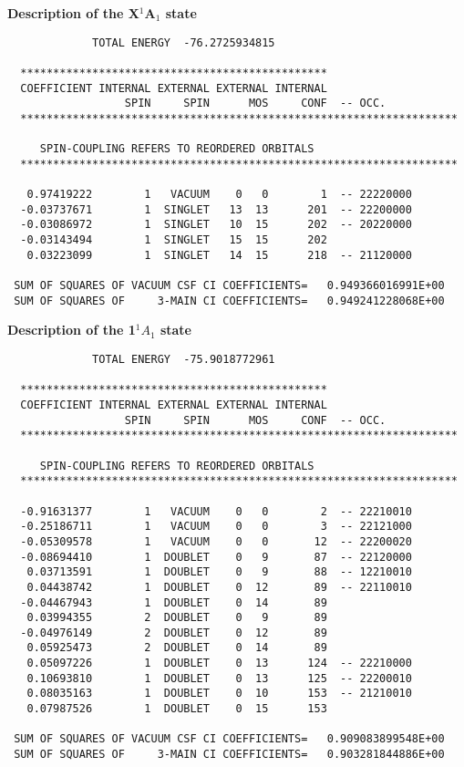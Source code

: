 \documentclass[11pt,fleqn]{article}
\begin{document}
{\bf Description of the X$^{1}$A$_{1}$ state}
{
\footnotesize
\begin{verbatim}
             TOTAL ENERGY  -76.2725934815

  ***********************************************
  COEFFICIENT INTERNAL EXTERNAL EXTERNAL INTERNAL
                  SPIN     SPIN      MOS     CONF  -- OCC.
  *******************************************************************

     SPIN-COUPLING REFERS TO REORDERED ORBITALS
  *******************************************************************

   0.97419222        1   VACUUM    0   0        1  -- 22220000
  -0.03737671        1  SINGLET   13  13      201  -- 22200000
  -0.03086972        1  SINGLET   10  15      202  -- 20220000
  -0.03143494        1  SINGLET   15  15      202
   0.03223099        1  SINGLET   14  15      218  -- 21120000

 SUM OF SQUARES OF VACUUM CSF CI COEFFICIENTS=   0.949366016991E+00
 SUM OF SQUARES OF     3-MAIN CI COEFFICIENTS=   0.949241228068E+00
\end{verbatim}
}
{\bf Description of the 1$^{1}A_{1}$ state}
{
\footnotesize
\begin{verbatim}
             TOTAL ENERGY  -75.9018772961

  ***********************************************
  COEFFICIENT INTERNAL EXTERNAL EXTERNAL INTERNAL
                  SPIN     SPIN      MOS     CONF  -- OCC.
  *******************************************************************

     SPIN-COUPLING REFERS TO REORDERED ORBITALS
  *******************************************************************

  -0.91631377        1   VACUUM    0   0        2  -- 22210010
  -0.25186711        1   VACUUM    0   0        3  -- 22121000
  -0.05309578        1   VACUUM    0   0       12  -- 22200020
  -0.08694410        1  DOUBLET    0   9       87  -- 22120000
   0.03713591        1  DOUBLET    0   9       88  -- 12210010
   0.04438742        1  DOUBLET    0  12       89  -- 22110010
  -0.04467943        1  DOUBLET    0  14       89
   0.03994355        2  DOUBLET    0   9       89
  -0.04976149        2  DOUBLET    0  12       89
   0.05925473        2  DOUBLET    0  14       89
   0.05097226        1  DOUBLET    0  13      124  -- 22210000
   0.10693810        1  DOUBLET    0  13      125  -- 22200010
   0.08035163        1  DOUBLET    0  10      153  -- 21210010
   0.07987526        1  DOUBLET    0  15      153
 
 SUM OF SQUARES OF VACUUM CSF CI COEFFICIENTS=   0.909083899548E+00
 SUM OF SQUARES OF     3-MAIN CI COEFFICIENTS=   0.903281844886E+00
\end{verbatim}
}
\end{document}
